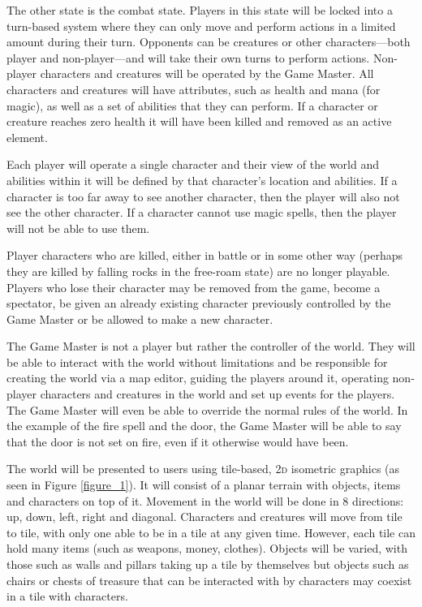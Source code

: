 The other state is the combat state. Players in this state will be locked into a turn-based system where they can only move and perform actions in a limited amount during their turn. Opponents can be creatures or other characters—both player and non-player—and will take their own turns to perform actions. Non-player characters and creatures will be operated by the Game Master. All characters and creatures will have attributes, such as health and mana (for magic), as well as a set of abilities that they can perform. If a character or creature reaches zero health it will have been killed and removed as an active element.

Each player will operate a single character and their view of the world and abilities within it will be defined by that character's location and abilities. If a character is too far away to see another character, then the player will also not see the other character. If a character cannot use magic spells, then the player will not be able to use them.

Player characters who are killed, either in battle or in some other way (perhaps they are killed by falling rocks in the free-roam state) are no longer playable. Players who lose their character may be removed from the game, become a spectator, be given an already existing character previously controlled by the Game Master or be allowed to make a new character.

The Game Master is not a player but rather the controller of the world. They will be able to interact with the world without limitations and be responsible for creating the world via a map editor, guiding the players around it, operating non-player characters and creatures in the world and set up events for the players. The Game Master will even be able to override the normal rules of the world. In the example of the fire spell and the door, the Game Master will be able to say that the door is not set on fire, even if it otherwise would have been.

The world will be presented to users using tile-based, \textsc{2d} isometric graphics (as seen in Figure \ref{figure_1}). It will consist of a planar terrain with objects, items and characters on top of it. Movement in the world will be done in 8 directions: up, down, left, right and diagonal. Characters and creatures will move from tile to tile, with only one able to be in a tile at any given time. However, each tile can hold many items (such as weapons, money, clothes). Objects will be varied, with those such as walls and pillars taking up a tile by themselves but objects such as chairs or chests of treasure that can be interacted with by characters may coexist in a tile with characters.

